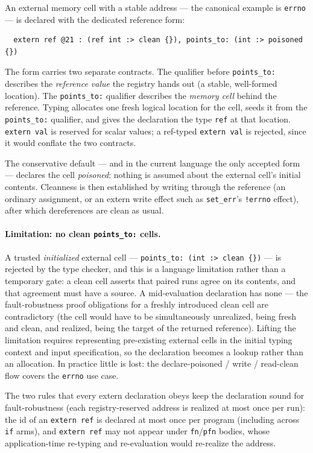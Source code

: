 \documentclass[12pt]{article}
\begin{document}
An external memory cell with a stable address — the canonical example is
\texttt{errno} — is declared with the dedicated reference form:
\begin{verbatim}
  extern ref @21 : (ref int :> clean {}), points_to: (int :> poisoned {})
\end{verbatim}
The form carries two separate contracts.  The qualifier before
\texttt{points\_to:} describes the \emph{reference value} the registry hands
out (a stable, well-formed location).  The \texttt{points\_to:} qualifier
describes the \emph{memory cell} behind the reference.  Typing allocates one
fresh logical location for the cell, seeds it from the \texttt{points\_to:}
qualifier, and gives the declaration the type \texttt{ref} at that location.
\texttt{extern val} is reserved for scalar values; a ref-typed
\texttt{extern val} is rejected, since it would conflate the two contracts.

The conservative default — and in the current language the only accepted
form — declares the cell \emph{poisoned}: nothing is assumed about the
external cell's initial contents.  Cleanness is then established by writing
through the reference (an ordinary assignment, or an extern write effect such
as \texttt{set\_err}'s \texttt{!errno} effect), after which dereferences are
clean as usual.

\paragraph{Limitation: no clean \texttt{points\_to:} cells.}
A trusted \emph{initialized} external cell —
\texttt{points\_to: (int :> clean \{\})} — is rejected by the type checker,
and this is a language limitation rather than a temporary gate: a clean cell
asserts that paired runs agree on its contents, and that agreement must have
a source.  A mid-evaluation declaration has none — the fault-robustness
proof obligations for a freshly introduced clean cell are contradictory
(the cell would have to be simultaneously unrealized, being fresh and clean,
and realized, being the target of the returned reference).  Lifting the
limitation requires representing pre-existing external cells in the initial
typing context and input specification, so the declaration becomes a lookup
rather than an allocation.  In practice little is lost: the
declare-poisoned / write / read-clean flow covers the \texttt{errno} use
case.

The two rules that every extern declaration obeys keep the declaration sound
for fault-robustness (each registry-reserved address is realized at most once
per run): the id of an \texttt{extern ref} is declared at most once per
program (including across \texttt{if} arms), and \texttt{extern ref} may not
appear under \texttt{fn}/\texttt{pfn} bodies, whose application-time
re-typing and re-evaluation would re-realize the address.
\end{document}
